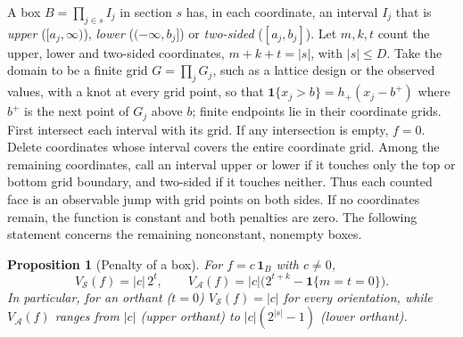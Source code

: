 \documentclass[11pt]{article}
\newtheorem{proposition}{Proposition}
\theoremstyle{definition}
\theoremstyle{remark}
\newcommand{\one}{\mathbf{1}}
\begin{document}
A box $B = \prod_{j \in s} I_j$ in section $s$ has, in each coordinate,
an interval $I_j$ that is \emph{upper} ($[a_j,\infty)$), \emph{lower}
($(-\infty,b_j]$) or \emph{two-sided} ($[a_j,b_j]$). Let $m,k,t$ count
the upper, lower and two-sided coordinates, $m+k+t=|s|$, with $|s| \le D$.
Take the domain to be a finite grid $G = \prod_j G_j$, such as a lattice
design or the observed values, with a knot at every grid point, so that
$\one\{x_j > b\} = h_+(x_j - b^+)$ where $b^+$ is the next point of $G_j$
above $b$; finite endpoints lie in their coordinate grids. First intersect
each interval with its grid. If any intersection is empty, $f=0$. Delete
coordinates whose interval covers the entire coordinate grid. Among the
remaining coordinates, call an interval upper or lower if it touches only
the top or bottom grid boundary, and two-sided if it touches neither.
Thus each counted face is an observable jump with grid points on both
sides. If no coordinates remain, the function is constant and both
penalties are zero. The following statement concerns the remaining
nonconstant, nonempty boxes.

\begin{proposition}[Penalty of a box]\label{prop:box}
For $f = c\,\one_B$ with $c \neq 0$,
\[
  V_{\mathcal{S}}(f) = |c|\, 2^{t}, \qquad
  V_{\mathcal{A}}(f) = |c| \big(2^{t+k} - \one\{m = t = 0\}\big).
\]
In particular, for an orthant ($t = 0$) $V_{\mathcal{S}}(f) = |c|$ for
every orientation, while $V_{\mathcal{A}}(f)$ ranges from $|c|$ (upper
orthant) to $|c|(2^{|s|}-1)$ (lower orthant).
\end{proposition}
\end{document}
